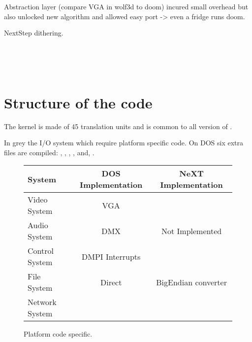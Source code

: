 Abstraction layer (compare VGA in wolf3d to doom) incured small overhead but also unlocked new algorithm and allowed easy port -> even a fridge runs doom.\\
\par
NextStep dithering.\\
\\ 

\\
\par
{}\\
\par
{}



\section{Structure of the code}
The kernel is made of 45 translation units and is common to all version of \doom.\\
\par

\par

In grey the I/O system which require platform specific code. On DOS six extra files are compiled: , , , ,  and, . \\
\par

 \begin{figure}[H]
\centering  
\begin{tabularx}{\textwidth}{ L{0.22} | C{0.39} | C{0.39} }
  \toprule
  \textbf{System} & \textbf{DOS Implementation} & \textbf{NeXT Implementation}\\
  \toprule 
    Video System & VGA &  \\
    Audio System & DMX & Not Implemented\\
    Control System & DMPI Interrupts &  \\
    File  System & Direct & BigEndian converter\\
    Network System &  &  \\
   \toprule
\end{tabularx}
\caption{Platform code specific.}
\end{figure}

